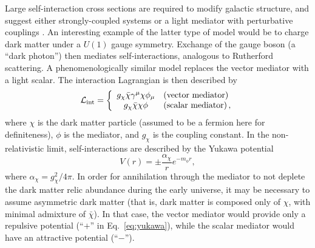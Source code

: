 Large self-interaction cross sections are required to modify galactic structure, and suggest either strongly-coupled systems \citep[see,  \eg][]{Frandsen:2011kt,Hochberg:2014dra,Hochberg:2014kqa} or a light mediator with perturbative couplings \citep[see \eg][]{Feng:2009mn,Ackerman:2008gi,Kaplan:2009de,Feng:2009hw,Buckley:2009in,Loeb:2010gj,Tulin:2012wi,Tulin:2013teo,Schutz:2014nka,Blennow:2016gde}. An interesting example of the latter type of model would be to charge dark matter under a $U(1)$ gauge symmetry. %
Exchange of the gauge boson (a ``dark photon'') then mediates self-interactions, analogous to Rutherford scattering. A phenomenologically similar model replaces the vector mediator with a light scalar. The interaction Lagrangian is then described by %
\begin{equation}
\label{eq:sidm}
{\cal L_{\rm int}}=\bigg\{
\begin{array}{c l}
g_\chi\bar{\chi}\gamma^\mu\chi\phi_\mu & \text{(vector mediator)}\\
g_\chi\bar{\chi}\chi\phi & \text{(scalar mediator)} \, ,
\end{array}
\end{equation}
where $\chi$ is the dark matter particle (assumed to be a fermion here for definiteness), $\phi$ is the mediator, and $g_\chi$ is the coupling constant. In the non-relativistic limit, self-interactions are described by the Yukawa potential
\begin{equation}
V(r)=\pm\frac{\alpha_\chi}{r}e^{-m_\phi r},
\label{eq:yukawa}
\end{equation}
where $\alpha_\chi = g_\chi^2/4\pi$. In order for annihilation through the mediator to not deplete the dark matter relic abundance during the early universe, it may be necessary to assume asymmetric dark matter (that is, dark matter is composed only of $\chi$, with minimal admixture of $\bar\chi$). In that case, the vector mediator would provide only a repulsive potential (``$+$'' in Eq.~\ref{eq:yukawa}), while the scalar mediator would have an attractive potential (``$-$'').


